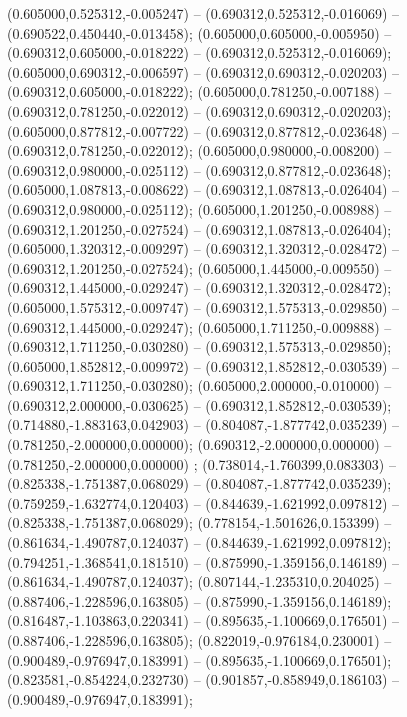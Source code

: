  (0.605000,0.525312,-0.005247) -- (0.690312,0.525312,-0.016069) -- (0.690522,0.450440,-0.013458);
 (0.605000,0.605000,-0.005950) -- (0.690312,0.605000,-0.018222) -- (0.690312,0.525312,-0.016069);
 (0.605000,0.690312,-0.006597) -- (0.690312,0.690312,-0.020203) -- (0.690312,0.605000,-0.018222);
 (0.605000,0.781250,-0.007188) -- (0.690312,0.781250,-0.022012) -- (0.690312,0.690312,-0.020203);
 (0.605000,0.877812,-0.007722) -- (0.690312,0.877812,-0.023648) -- (0.690312,0.781250,-0.022012);
 (0.605000,0.980000,-0.008200) -- (0.690312,0.980000,-0.025112) -- (0.690312,0.877812,-0.023648);
 (0.605000,1.087813,-0.008622) -- (0.690312,1.087813,-0.026404) -- (0.690312,0.980000,-0.025112);
 (0.605000,1.201250,-0.008988) -- (0.690312,1.201250,-0.027524) -- (0.690312,1.087813,-0.026404);
 (0.605000,1.320312,-0.009297) -- (0.690312,1.320312,-0.028472) -- (0.690312,1.201250,-0.027524);
 (0.605000,1.445000,-0.009550) -- (0.690312,1.445000,-0.029247) -- (0.690312,1.320312,-0.028472);
 (0.605000,1.575312,-0.009747) -- (0.690312,1.575313,-0.029850) -- (0.690312,1.445000,-0.029247);
 (0.605000,1.711250,-0.009888) -- (0.690312,1.711250,-0.030280) -- (0.690312,1.575313,-0.029850);
 (0.605000,1.852812,-0.009972) -- (0.690312,1.852812,-0.030539) -- (0.690312,1.711250,-0.030280);
 (0.605000,2.000000,-0.010000) -- (0.690312,2.000000,-0.030625) -- (0.690312,1.852812,-0.030539);
 (0.714880,-1.883163,0.042903) -- (0.804087,-1.877742,0.035239) -- (0.781250,-2.000000,0.000000);
 (0.690312,-2.000000,0.000000) -- (0.781250,-2.000000,0.000000) ;
 (0.738014,-1.760399,0.083303) -- (0.825338,-1.751387,0.068029) -- (0.804087,-1.877742,0.035239);
 (0.759259,-1.632774,0.120403) -- (0.844639,-1.621992,0.097812) -- (0.825338,-1.751387,0.068029);
 (0.778154,-1.501626,0.153399) -- (0.861634,-1.490787,0.124037) -- (0.844639,-1.621992,0.097812);
 (0.794251,-1.368541,0.181510) -- (0.875990,-1.359156,0.146189) -- (0.861634,-1.490787,0.124037);
 (0.807144,-1.235310,0.204025) -- (0.887406,-1.228596,0.163805) -- (0.875990,-1.359156,0.146189);
 (0.816487,-1.103863,0.220341) -- (0.895635,-1.100669,0.176501) -- (0.887406,-1.228596,0.163805);
 (0.822019,-0.976184,0.230001) -- (0.900489,-0.976947,0.183991) -- (0.895635,-1.100669,0.176501);
 (0.823581,-0.854224,0.232730) -- (0.901857,-0.858949,0.186103) -- (0.900489,-0.976947,0.183991);
